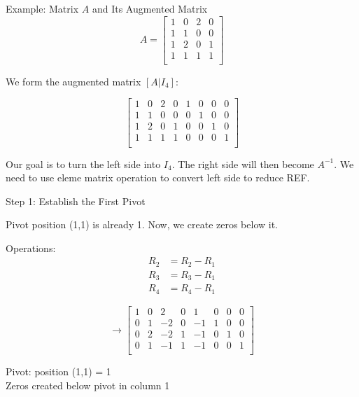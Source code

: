 \documentclass[aspectratio=169,xcolor=dvipsnames,svgnames,x11names,fleqn]{beamer}
\begin{document}
\begin{frame}{Example: Matrix $A$ and Its Augmented Matrix}
    \footnotesize
\centering
$$
A = \begin{bmatrix}
1 & 0 & 2 & 0 \\
1 & 1 & 0 & 0 \\
1 & 2 & 0 & 1 \\
1 & 1 & 1 & 1 \\
\end{bmatrix}
$$

\vspace{3mm}
We form the augmented matrix $[A | I_4]$:

$$
\left[\begin{array}{cccc|cccc}
1 & 0 & 2 & 0 & 1 & 0 & 0 & 0 \\
1 & 1 & 0 & 0 & 0 & 1 & 0 & 0 \\
1 & 2 & 0 & 1 & 0 & 0 & 1 & 0 \\
1 & 1 & 1 & 1 & 0 & 0 & 0 & 1 \\
\end{array}\right]
$$

\vspace{3mm}
Our goal is to turn the left side into $I_4$. The right side will then become $A^{-1}$. We need to use eleme matrix operation to convert left side to reduce REF.
\end{frame}


\begin{frame}{Step 1: Establish the First Pivot}
    \footnotesize

\centering
Pivot position (1,1) is already \alert{1}. Now, we create zeros below it.

\vspace{3mm}
Operations:
\begin{align*}
R_2 &= R_2 - R_1 \\
R_3 &= R_3 - R_1 \\
R_4 &= R_4 - R_1
\end{align*}

\vspace{3mm}
$$
\rightarrow \left[\begin{array}{cccc|cccc}
1 & 0 & 2 & 0 & 1 & 0 & 0 & 0 \\
0 & 1 & -2 & 0 & -1 & 1 & 0 & 0 \\
0 & 2 & -2 & 1 & -1 & 0 & 1 & 0 \\
0 & 1 & -1 & 1 & -1 & 0 & 0 & 1 \\
\end{array}\right]
$$

\vspace{3mm}
\colorbox{red!20}{Pivot: position (1,1) = 1} \\
\colorbox{blue!20}{Zeros created below pivot in column 1}
\end{frame}
\end{document}
